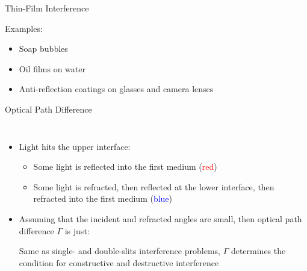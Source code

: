 \documentclass[12pt,compress,aspectratio=169]{beamer}
\begin{document}
\begin{frame}{Thin-Film Interference}
  \begin{center}
    \hspace{.01in}
    \hspace{.01in}
  \end{center}
  Examples:
  \begin{itemize}
  \item Soap bubbles
  \item Oil films on water
  \item Anti-reflection coatings on glasses and camera lenses
  \end{itemize}
\end{frame}



\begin{frame}{Optical Path Difference}
  \begin{columns}
    
    \begin{itemize}
    \item Light hits the upper interface:
      \begin{itemize}
      \item Some light is reflected into the first medium
        (\textcolor{red}{red})
      \item Some light is refracted, then reflected at the lower interface,
        then refracted into the first medium (\textcolor{blue}{blue})
      \end{itemize}
    \item Assuming that the incident and refracted angles are small, then
      optical path difference $\Gamma$ is just:


    \vspace{-.15in}Same as single- and double-slits interference problems,
    $\Gamma$ determines the condition for constructive and destructive
    interference
    \end{itemize}
  \end{columns}
\end{frame}
\end{document}
